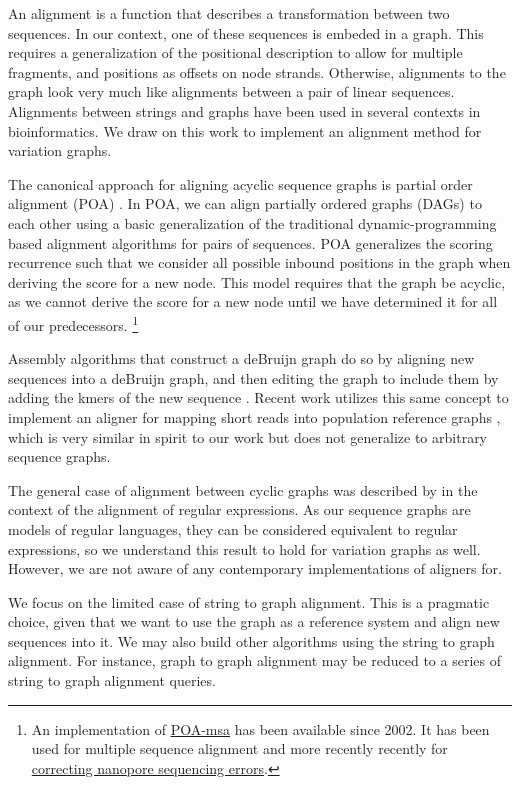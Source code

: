 \documentclass{article}
\begin{document}
An alignment is a function that describes a transformation between two sequences.
In our context, one of these sequences is embeded in a graph.
This requires a generalization of the positional description to allow for multiple fragments, and positions as offsets on node strands.
Otherwise, alignments to the graph look very much like alignments between a pair of linear sequences.
Alignments between strings and graphs have been used in several contexts in bioinformatics.
We draw on this work to implement an alignment method for variation graphs.

The canonical approach for aligning acyclic sequence graphs is partial order alignment (POA) \cite{lee2002POA}.
In POA, we can align partially ordered graphs (DAGs) to each other using a basic generalization of the traditional dynamic-programming based alignment algorithms for pairs of sequences.
POA generalizes the scoring recurrence such that we consider all possible inbound positions in the graph when deriving the score for a new node.
This model requires that the graph be acyclic, as we cannot derive the score for a new node until we have determined it for all of our predecessors.
\footnote{An implementation of \href{https://sourceforge.net/projects/poamsa/}{POA-msa} has been available since 2002. It has been used for multiple sequence alignment and more recently recently for \href{https://simpsonlab.github.io/2015/03/30/optimizing-hmm/}{correcting nanopore sequencing errors}.}

Assembly algorithms that construct a deBruijn graph do so by aligning new sequences into a deBruijn graph, and then editing the graph to include them by adding the kmers of the new sequence \cite{iqbal2013, zerbino2008}.
Recent work utilizes this same concept to implement an aligner for mapping short reads into population reference graphs \cite{prg2015}, which is very similar in spirit to our work but does not generalize to arbitrary sequence graphs.

The general case of alignment between cyclic graphs was described by \cite{myers1989} in the context of the alignment of regular expressions.
As our sequence graphs are models of regular languages, they can be considered equivalent to regular expressions, so we understand this result to hold for variation graphs as well.
However, we are not aware of any contemporary implementations of aligners for.

We focus on the limited case of string to graph alignment.
This is a pragmatic choice, given that we want to use the graph as a reference system and align new sequences into it.
We may also build other algorithms using the string to graph alignment.
For instance, graph to graph alignment may be reduced to a series of string to graph alignment queries.
\end{document}
